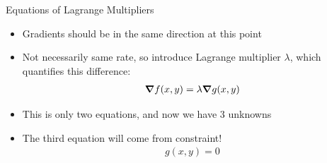 \documentclass{beamer}
\begin{document}
\begin{frame}{Equations of Lagrange Multipliers}
  \begin{itemize}
  \item Gradients should be in the same direction at this point
  \item Not necessarily same rate, so introduce Lagrange multiplier $\lambda$, which quantifies this difference:
    \begin{align*}
      \grad{f(x,y)}=\lambda\grad{g(x,y)}
    \end{align*}
  \item This is only two equations, and now we have 3 unknowns
  \item The third equation will come from constraint!
    \begin{align*}
      g(x,y)=0
    \end{align*}
  \end{itemize}
\end{frame}
\end{document}
